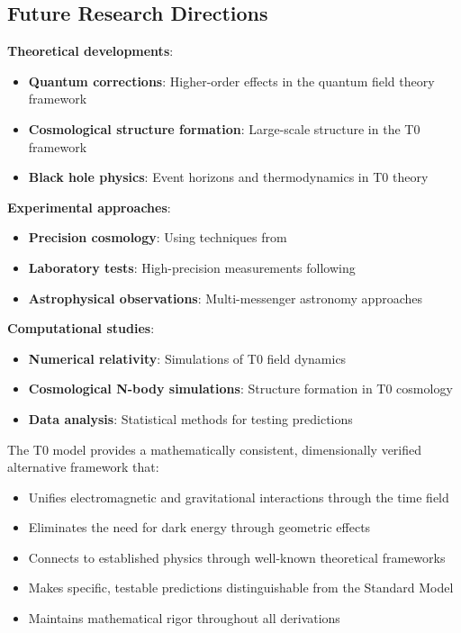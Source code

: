 \documentclass[12pt,a4paper]{article}
\begin{document}
	\subsection{Future Research Directions}
	\label{subsec:future_research}
	
	\textbf{Theoretical developments}:
	\begin{itemize}
		\item \textbf{Quantum corrections}: Higher-order effects in the quantum field theory framework
		\item \textbf{Cosmological structure formation}: Large-scale structure in the T0 framework
		\item \textbf{Black hole physics}: Event horizons and thermodynamics in T0 theory
	\end{itemize}
	
	\textbf{Experimental approaches}:
	\begin{itemize}
		\item \textbf{Precision cosmology}: Using techniques from \citep{weinberg2008,planck2020}
		\item \textbf{Laboratory tests}: High-precision measurements following \citep{will2014}
		\item \textbf{Astrophysical observations}: Multi-messenger astronomy approaches \citep{abbott2017}
	\end{itemize}
	
	\textbf{Computational studies}:
	\begin{itemize}
		\item \textbf{Numerical relativity}: Simulations of T0 field dynamics
		\item \textbf{Cosmological N-body simulations}: Structure formation in T0 cosmology
		\item \textbf{Data analysis}: Statistical methods for testing predictions
	\end{itemize}
	
	\begin{tcolorbox}[colback=green!5!white,colframe=green!75!black,title=T0 Model: A Unified Framework]
		The T0 model provides a mathematically consistent, dimensionally verified alternative framework that:
		\begin{itemize}
			\item Unifies electromagnetic and gravitational interactions through the time field
			\item Eliminates the need for dark energy through geometric effects
			\item Connects to established physics through well-known theoretical frameworks
			\item Makes specific, testable predictions distinguishable from the Standard Model
			\item Maintains mathematical rigor throughout all derivations
		\end{itemize}
	\end{tcolorbox}
	
\end{document}
